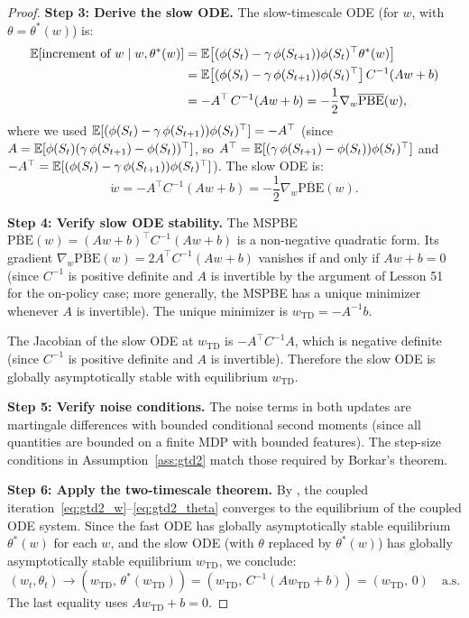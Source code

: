 \documentclass[11pt,a4paper]{article}
\begin{document}
\begin{proof}
\textbf{Step 3: Derive the slow ODE.}
The slow-timescale ODE (for $w$, with $\theta = \theta^*(w)$) is:
\begin{align}
  \mathbb{E}[\text{increment of } w \mid w, \theta^*(w)]
  &= \mathbb{E}\bigl[(\phi(S_t) - \gamma\,\phi(S_{t+1}))
     \phi(S_t)^\top\theta^*(w)\bigr]
  \nonumber\\
  &= \mathbb{E}\bigl[(\phi(S_t) - \gamma\,\phi(S_{t+1}))
     \phi(S_t)^\top\bigr]\, C^{-1}(Aw + b)
  \nonumber\\
  &= -A^\top\, C^{-1}(Aw + b)
  = -\frac{1}{2}\nabla_w \overline{\mathrm{PBE}}(w),
  \label{eq:slow_ode_rhs}
\end{align}
where we used
$\mathbb{E}[(\phi(S_t) - \gamma\,\phi(S_{t+1}))\phi(S_t)^\top]
= -A^\top$ (since $A = \mathbb{E}[\phi(S_t)(\gamma\,\phi(S_{t+1})
- \phi(S_t))^\top]$, so $A^\top
= \mathbb{E}[(\gamma\,\phi(S_{t+1}) - \phi(S_t))\phi(S_t)^\top]$
and $-A^\top = \mathbb{E}[(\phi(S_t)
- \gamma\,\phi(S_{t+1}))\phi(S_t)^\top]$).
The slow ODE is:
\begin{equation}
  \dot{w} = -A^\top C^{-1}(Aw + b)
  = -\frac{1}{2}\nabla_w \overline{\mathrm{PBE}}(w).
  \label{eq:slow_ode}
\end{equation}

\textbf{Step 4: Verify slow ODE stability.}
The MSPBE $\overline{\mathrm{PBE}}(w) = (Aw+b)^\top C^{-1}(Aw+b)$
is a non-negative quadratic form. Its gradient
$\nabla_w \overline{\mathrm{PBE}}(w) = 2A^\top C^{-1}(Aw + b)$
vanishes if and only if $Aw + b = 0$ (since $C^{-1}$ is positive
definite and $A$ is invertible by the argument of Lesson 51 for
the on-policy case; more generally, the MSPBE has a unique minimizer
whenever $A$ is invertible). The unique minimizer is
$w_{\mathrm{TD}} = -A^{-1}b$.

The Jacobian of the slow ODE at $w_{\mathrm{TD}}$ is
$-A^\top C^{-1} A$, which is negative definite (since $C^{-1}$ is
positive definite and $A$ is invertible). Therefore the slow ODE is
globally asymptotically stable with equilibrium $w_{\mathrm{TD}}$.

\textbf{Step 5: Verify noise conditions.}
The noise terms in both updates are martingale differences with
bounded conditional second moments (since all quantities are bounded
on a finite MDP with bounded features). The step-size conditions in
Assumption~\ref{ass:gtd2} match those required by Borkar's theorem.

\textbf{Step 6: Apply the two-timescale theorem.}
By \citet[Theorem 2, Chapter 6]{borkar2008}, the coupled
iteration~\eqref{eq:gtd2_w}--\eqref{eq:gtd2_theta} converges to the
equilibrium of the coupled ODE system. Since the fast ODE has globally
asymptotically stable equilibrium $\theta^*(w)$ for each $w$, and
the slow ODE (with $\theta$ replaced by $\theta^*(w)$) has globally
asymptotically stable equilibrium $w_{\mathrm{TD}}$, we conclude:
\begin{equation}
  (w_t, \theta_t) \to
  (w_{\mathrm{TD}},\, \theta^*(w_{\mathrm{TD}}))
  = (w_{\mathrm{TD}},\, C^{-1}(Aw_{\mathrm{TD}} + b))
  = (w_{\mathrm{TD}},\, 0) \quad \text{a.s.}
\end{equation}
The last equality uses $Aw_{\mathrm{TD}} + b = 0$.
\end{proof}
\end{document}
